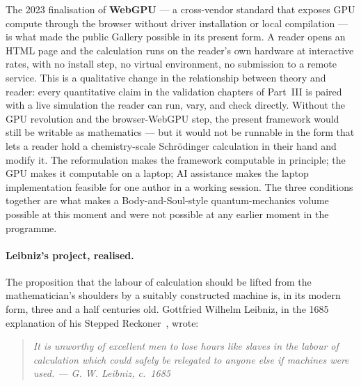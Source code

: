 The 2023 finalisation of \textbf{WebGPU} --- a cross-vendor standard that exposes GPU compute through the browser without driver installation or local compilation --- is what made the public Gallery possible in its present form. A reader opens an HTML page and the calculation runs on the reader's own hardware at interactive rates, with no install step, no virtual environment, no submission to a remote service. This is a qualitative change in the relationship between theory and reader: every quantitative claim in the validation chapters of Part~III is paired with a live simulation the reader can run, vary, and check directly. Without the GPU revolution and the browser-WebGPU step, the present framework would still be writable as mathematics --- but it would not be runnable in the form that lets a reader hold a chemistry-scale Schr\"odinger calculation in their hand and modify it. The reformulation makes the framework computable in principle; the GPU makes it computable on a laptop; AI assistance makes the laptop implementation feasible for one author in a working session. The three conditions together are what makes a Body-and-Soul-style quantum-mechanics volume possible at this moment and were not possible at any earlier moment in the programme.

\paragraph{Leibniz's project, realised.}
The proposition that the labour of calculation should be lifted from the mathematician's shoulders by a suitably constructed machine is, in its modern form, three and a half centuries old. Gottfried Wilhelm Leibniz, in the 1685 explanation of his Stepped Reckoner~\cite{Leibniz1685}, wrote:

\begin{quote}
\itshape It is unworthy of excellent men to lose hours like slaves in the labour of calculation which could safely be relegated to anyone else if machines were used.
\hfill --- G. W. Leibniz, c.~1685
\end{quote}

